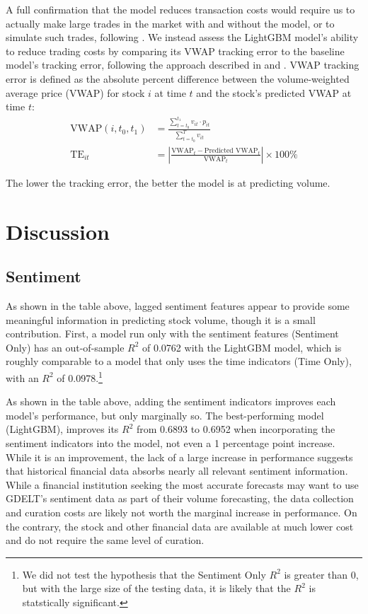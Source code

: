 \documentclass[12pt]{article}
\begin{document}
A full confirmation that the model reduces transaction costs would require us to actually make large trades in the market with and without the model, or to simulate such trades, following \textcite{satish2014predicting}. We instead assess the LightGBM model's ability to reduce trading costs by comparing its VWAP tracking error to the baseline model's tracking error, following the approach described in \textcite{cucuringu2025forecasting} and \textcite{chen2016forecasting}. VWAP tracking error is defined as the absolute percent difference between the volume-weighted average price (VWAP) for stock $i$ at time $t$ and the stock's predicted VWAP at time $t$:
\begin{align}
    \text{VWAP}(i,t_0,t_1) &= \frac{\sum_{t=t_0}^{t_1} v_{it} \cdot p_{it}}{\sum_{t=t_0}^T v_{it}} \\
    \text{TE}_{it} &= \left| \frac{\text{VWAP}_t - \text{Predicted VWAP}_t}{\text{VWAP}_t} \right| \times 100\%
\end{align}

The lower the tracking error, the better the model is at predicting volume.

\newpage
\section{Discussion}
\label{section:discussion}
\subsection{Sentiment}
As shown in the table above, lagged sentiment features appear to provide some meaningful information in predicting stock volume, though it is a small contribution. First, a model run only with the sentiment features (Sentiment Only) has an out-of-sample $R^2$ of 0.0762 with the LightGBM model, which is roughly comparable to a model that only uses the time indicators (Time Only), with an $R^2$ of 0.0978.\footnote{We did not test the hypothesis that the Sentiment Only $R^2$ is greater than 0, but with the large size of the testing data, it is likely that the $R^2$ is statstically significant.}

As shown in the table above, adding the sentiment indicators improves each model's performance, but only marginally so. The best-performing model (LightGBM), improves its $R^2$ from 0.6893 to 0.6952 when incorporating the sentiment indicators into the model, not even a 1 percentage point increase. While it is an improvement, the lack of a large increase in performance suggests that historical financial data absorbs nearly all relevant sentiment information. While a financial institution seeking the most accurate forecasts may want to use GDELT's sentiment data as part of their volume forecasting, the data collection and curation costs are likely not worth the marginal increase in performance. On the contrary, the stock and other financial data are available at much lower cost and do not require the same level of curation.
\end{document}
